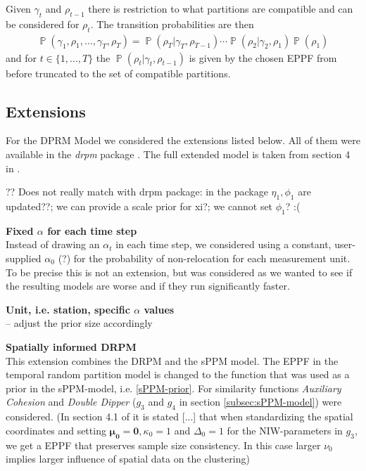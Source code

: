 \documentclass[12pt,a4paper]{article}
\DeclareMathOperator{\PP}{\mathbb{P}}
\begin{document}
Given $\gamma_t$ and $\rho_{t-1}$ there is restriction to what partitions are compatible and can be considered for $\rho_{t}$. The transition probabilities are then
\begin{align*}
    \PP(\gamma_1, \rho_1, \ldots, \gamma_T, \rho_T) = \PP(\rho_T\vert \gamma_T, \rho_{T-1})  \cdots  \PP(\rho_2\vert \gamma_2, \rho_{1}) \PP(\rho_1)
\end{align*}
and for $t \in \{1, \dots, T \}$ the $\PP(\rho_t\vert \gamma_t, \rho_{t-1})$ is given by the chosen EPPF from before truncated to the set of compatible partitions.

\subsection{Extensions}
\label{subsec:DRPMExtensions}

For the DPRM Model we considered the extensions listed below. All of them were available in the \textit{drpm} package \cite{drpm}. The full extended model is taken from section 4 in \cite{Page2021-Temporal}. \medskip

?? Does not really match with drpm package: in the package $\eta_1, \phi_1$ are updated??; we can provide a scale prior for xi?; we cannot set $\phi_1$? :(

\textbf{Fixed $\alpha$ for each time step}\\
Instead of drawing an $\alpha_t$ in each time step, we considered using a constant, user-supplied $\alpha_0$ (?) for the probability of non-relocation for each measurement unit. To be precise this is not an extension, but was considered as we wanted to see if the resulting models are worse and if they run significantly faster. \medskip

\textbf{Unit, i.e. station, specific $\alpha$ values}\\ -- adjust the prior size accordingly \medskip


\textbf{Spatially informed DRPM}\\
This extension combines the DRPM and the sPPM model. The EPPF in the temporal random partition model is changed to the function that was used as a prior in the sPPM-model, i.e. \ref{sPPM-prior}. For similarity functions \textit{Auxiliary Cohesion} and \textit{Double Dipper} ($g_3$ and $g_4$ in section \ref{subsec:sPPM-model}) were considered. (In section 4.1 of \cite{Page2021-Temporal} it is stated [...] that when standardizing the spatial coordinates and setting $\mathbf{\mu_0} = \mathbf{0}, \kappa_0 = 1$ and $\Delta_0 = 1$ for the NIW-parameters in $g_3$, we get a EPPF that preserves sample size consistency. In this case larger $\nu_0$ implies larger influence of spatial data on the clustering) \medskip
\end{document}
